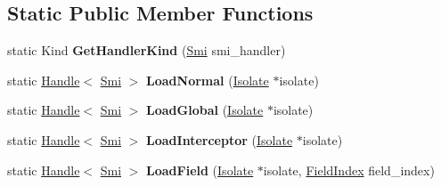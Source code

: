 \subsection*{Static Public Member Functions}
\begin{DoxyCompactItemize}
\item 
\mbox{\label{classv8_1_1internal_1_1LoadHandler_a5afd4f59470157640f454fa63a61a21d}} 
static Kind {\bfseries Get\+Handler\+Kind} (\mbox{\hyperlink{classv8_1_1internal_1_1Smi}{Smi}} smi\+\_\+handler)
\item 
\mbox{\label{classv8_1_1internal_1_1LoadHandler_a50aa3cc894af3ed304a2a29be9aa7119}} 
static \mbox{\hyperlink{classv8_1_1internal_1_1Handle}{Handle}}$<$ \mbox{\hyperlink{classv8_1_1internal_1_1Smi}{Smi}} $>$ {\bfseries Load\+Normal} (\mbox{\hyperlink{classv8_1_1internal_1_1Isolate}{Isolate}} $\ast$isolate)
\item 
\mbox{\label{classv8_1_1internal_1_1LoadHandler_ae99ae083d2edfc59ad924d520204178f}} 
static \mbox{\hyperlink{classv8_1_1internal_1_1Handle}{Handle}}$<$ \mbox{\hyperlink{classv8_1_1internal_1_1Smi}{Smi}} $>$ {\bfseries Load\+Global} (\mbox{\hyperlink{classv8_1_1internal_1_1Isolate}{Isolate}} $\ast$isolate)
\item 
\mbox{\label{classv8_1_1internal_1_1LoadHandler_a5af6c4be807c5f94757436b69ce9888b}} 
static \mbox{\hyperlink{classv8_1_1internal_1_1Handle}{Handle}}$<$ \mbox{\hyperlink{classv8_1_1internal_1_1Smi}{Smi}} $>$ {\bfseries Load\+Interceptor} (\mbox{\hyperlink{classv8_1_1internal_1_1Isolate}{Isolate}} $\ast$isolate)
\item 
\mbox{\label{classv8_1_1internal_1_1LoadHandler_a52ad4faa472742f44c102bfc801f7626}} 
static \mbox{\hyperlink{classv8_1_1internal_1_1Handle}{Handle}}$<$ \mbox{\hyperlink{classv8_1_1internal_1_1Smi}{Smi}} $>$ {\bfseries Load\+Field} (\mbox{\hyperlink{classv8_1_1internal_1_1Isolate}{Isolate}} $\ast$isolate, \mbox{\hyperlink{classv8_1_1internal_1_1FieldIndex}{Field\+Index}} field\+\_\+index)
\item 
\mbox{\label{classv8_1_1internal_1_1LoadHandler_ae14099dae0f2ea920fc2f1bf39b666f2}} 

\end{DoxyCompactItemize}
